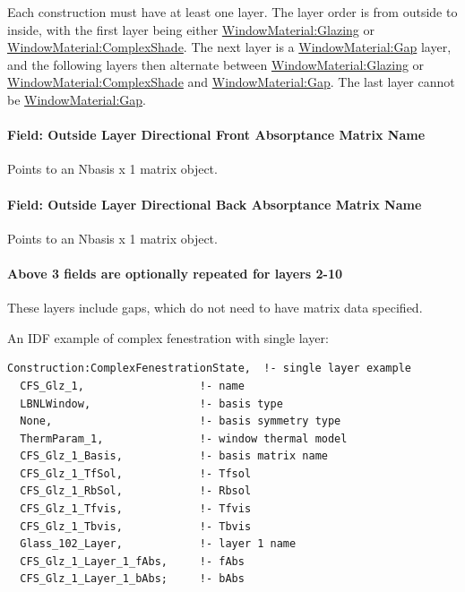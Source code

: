 Each construction must have at least one layer. The layer order is from outside to inside, with the first layer being either \hyperref[windowmaterialglazing]{WindowMaterial:Glazing} or \hyperref[windowmaterialcomplexshade]{WindowMaterial:ComplexShade}. The next layer is a \hyperref[windowmaterialgap]{WindowMaterial:Gap} layer, and the following layers then alternate between \hyperref[windowmaterialglazing]{WindowMaterial:Glazing} or \hyperref[windowmaterialcomplexshade]{WindowMaterial:ComplexShade} and \hyperref[windowmaterialgap]{WindowMaterial:Gap}. The last layer cannot be \hyperref[windowmaterialgap]{WindowMaterial:Gap}.

\paragraph{Field: Outside Layer Directional Front Absorptance Matrix Name}\label{field-outside-layer-directional-front-absorptance-matrix-name}

Points to an Nbasis x 1 matrix object.

\paragraph{Field: Outside Layer Directional Back Absorptance Matrix Name}\label{field-outside-layer-directional-back-absorptance-matrix-name}

Points to an Nbasis x 1 matrix object.

\paragraph{Above 3 fields are optionally repeated for layers 2-10}\label{above-3-fields-are-optionally-repeated-for-layers-2-10}

These layers include gaps, which do not need to have matrix data specified.

An IDF example of complex fenestration with single layer:

\begin{lstlisting}
Construction:ComplexFenestrationState,  !- single layer example
  CFS_Glz_1,                  !- name
  LBNLWindow,                 !- basis type
  None,                       !- basis symmetry type
  ThermParam_1,               !- window thermal model
  CFS_Glz_1_Basis,            !- basis matrix name
  CFS_Glz_1_TfSol,            !- Tfsol
  CFS_Glz_1_RbSol,            !- Rbsol
  CFS_Glz_1_Tfvis,            !- Tfvis
  CFS_Glz_1_Tbvis,            !- Tbvis
  Glass_102_Layer,            !- layer 1 name
  CFS_Glz_1_Layer_1_fAbs,     !- fAbs
  CFS_Glz_1_Layer_1_bAbs;     !- bAbs
\end{lstlisting}


